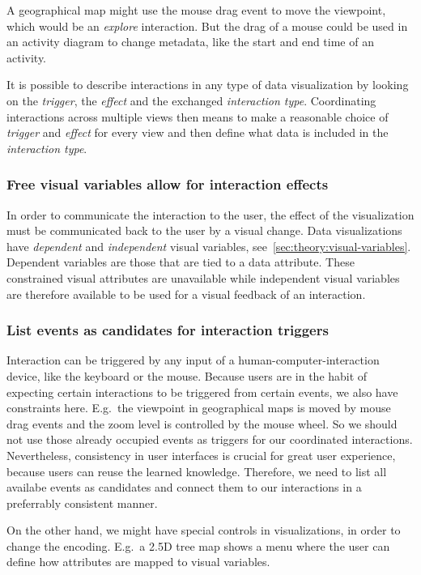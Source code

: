 \documentclass{article}
\newcommand{\tmap}{\textsc{2.5D} tree map}
\begin{document}
A geographical map might use the mouse drag event to move the viewpoint, which would be an \emph{explore} interaction.
But the drag of a mouse could be used in an activity diagram to change metadata, like the start and end time of an activity.

It is possible to describe interactions in any type of data visualization by looking on the \emph{trigger}, the \emph{effect} and the exchanged \emph{interaction type}.
Coordinating interactions across multiple views then means to make a reasonable choice of \emph{trigger} and \emph{effect} for every view and then define what data is included in the \emph{interaction type}.


\subsubsection{Free visual variables allow for interaction effects}

In order to communicate the interaction to the user, the effect of the visualization must be communicated back to the user by a visual change.
Data visualizations have \emph{dependent} and \emph{independent} visual variables, see~\ref{sec:theory:visual-variables}.
Dependent variables are those that are tied to a data attribute.
These constrained visual attributes are unavailable while independent visual variables are therefore available to be used for a visual feedback of an interaction.

\subsubsection{List events as candidates for interaction triggers}

Interaction can be triggered by any input of a human-computer-interaction device, like the keyboard or the mouse.
Because users are in the habit of expecting certain interactions to be triggered from certain events, we also have constraints here.
E.g.\ the viewpoint in geographical maps is moved by mouse drag events and the zoom level is controlled by the mouse wheel.
So we should not use those already occupied events as triggers for our coordinated interactions.
Nevertheless, consistency in user interfaces is crucial for great user experience, because users can reuse the learned knowledge.
Therefore, we need to list all availabe events as candidates and connect them to our interactions in a preferrably consistent manner.

On the other hand, we might have special controls in visualizations, in order to change the encoding.
E.g.\ a \tmap{} shows a menu where the user can define how attributes are mapped to visual variables.
\end{document}

